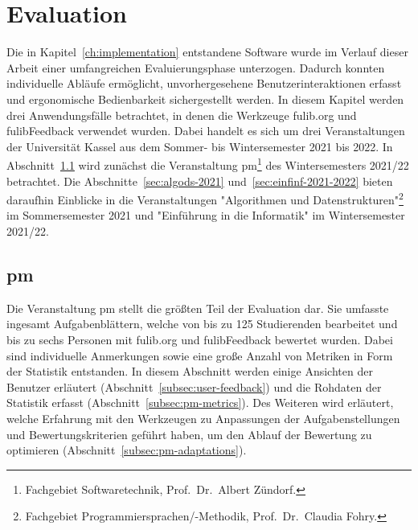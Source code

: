 \chapter{Evaluation}\label{ch:evaluation}

Die in Kapitel~\ref{ch:implementation} entstandene Software wurde im Verlauf dieser Arbeit einer umfangreichen Evaluierungsphase unterzogen.
Dadurch konnten individuelle Abläufe ermöglicht, unvorhergesehene Benutzerinteraktionen erfasst und ergonomische Bedienbarkeit sichergestellt werden.
In diesem Kapitel werden drei Anwendungsfälle betrachtet, in denen die Werkzeuge fulib.org und fulibFeedback verwendet wurden.
Dabei handelt es sich um drei Veranstaltungen der Universität Kassel aus dem Sommer- bis Wintersemester 2021 bis 2022.
In Abschnitt~\ref{sec:pm-2021-2022} wird zunächst die Veranstaltung \ac{pm}\footnote{
    Fachgebiet Softwaretechnik, Prof.\ Dr.\ Albert Zündorf.
} des Wintersemesters 2021/22 betrachtet.
Die Abschnitte~\ref{sec:algods-2021} und~\ref{sec:einfinf-2021-2022} bieten daraufhin Einblicke in die Veranstaltungen "Algorithmen und Datenstrukturen"\footnote{
    Fachgebiet Programmiersprachen/-Methodik, Prof.\ Dr.\ Claudia Fohry.\label{fn:fg-plm}
} im Sommersemester 2021 und "Einführung in die Informatik" im Wintersemester 2021/22.


\section{\acl{pm}}\label{sec:pm-2021-2022}

Die Veranstaltung \ac{pm} stellt die größten Teil der Evaluation dar.
Sie umfasste ingesamt  Aufgabenblättern, welche von bis zu 125 Studierenden bearbeitet und bis zu sechs Personen mit fulib.org und fulibFeedback bewertet wurden.
Dabei sind individuelle Anmerkungen sowie eine große Anzahl von Metriken in Form der Statistik entstanden.
In diesem Abschnitt werden einige Ansichten der Benutzer erläutert (Abschnitt~\ref{subsec:user-feedback}) und die Rohdaten der Statistik erfasst (Abschnitt~\ref{subsec:pm-metrics}).
Des Weiteren wird erläutert, welche Erfahrung mit den Werkzeugen zu Anpassungen der Aufgabenstellungen und Bewertungskriterien geführt haben, um den Ablauf der Bewertung zu optimieren (Abschnitt~\ref{subsec:pm-adaptations}).


